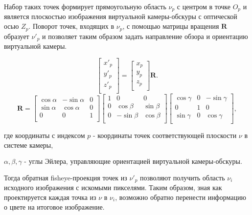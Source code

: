 Набор таких точек формирует прямоугольную область $\nu_p$ с центром в точке $O_p$ и является плоскостью изображения
 виртуальной камеры-обскуры  с оптической осью $Z_p$. Поворот точек, входящих в $\nu_p$, с помощью матрицы вращения 
 $\bm{R}$ образует $\nu'_p$ и позволяет таким образом задать направление обзора и ориентацию виртуальной камеры. 
\begin{eqseries}
    \begin{equation}
        \label{eq:sweeped}
        \left[\begin{matrix}x'_p\\y'_p\\z'_p\\\end{matrix}\right] = \left[\begin{matrix}x_p\\y_p\\z_p\\\end{matrix}\right] \bm{R}.
    \end{equation}  
    \begin{equation}
        \label{eq:R}
        \bm{R} = \left[\begin{matrix}\cos{\alpha}&-\sin{\alpha}&0\\\sin{\alpha}&\cos{\alpha}&0\\0&0&1\\\end{matrix}\right]\left[\begin{matrix}1&0&0\\0&\cos{\beta}&\sin{\beta}\\0&-\sin{\beta}&\cos{\beta}\\\end{matrix}\right]\left[\begin{matrix}\cos{\gamma}&0&-\sin{\gamma}\\0&1&0\\\sin{\gamma}&0&\cos{\gamma}\\\end{matrix}\right],
    \end{equation} 
\end{eqseries}

где координаты с индексом $p$ -  координаты точек соответствующей плоскости $\nu$ в системе камеры, 

\qquad $\alpha, \beta, \gamma$ - углы Эйлера, управляющие  ориентацией виртуальной камеры-обскуры. %

Тогда обратная fisheye-проекция точек из $\nu'_p$ позволяют получить область $\nu_i$ исходного изображения с искомыми пикселями. 
Таким образом, зная как  проектируется каждая точка из $\nu$ в $\nu_i$, возможно  обратно перенести информацию о цвете на итоговое изображение.  

